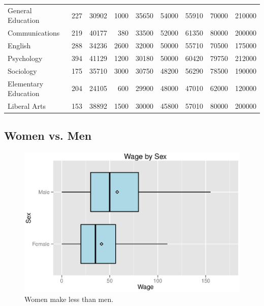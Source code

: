 \documentclass{exam}
\begin{document}
\begin{table}[ht]
\begin{tabular}{lrrrrrrrr}
      General Education    & 227   & 30902   & 1000 & 35650   & 54000  & 55910  & 70000   & 210000 \\
      Communications       & 219   & 40177   & 380  & 33500   & 52000  & 61350  & 80000   & 200000 \\
      English              & 288   & 34236   & 2600 & 32000   & 50000  & 55710  & 70500   & 175000 \\
      Psychology           & 394   & 41129   & 1200 & 30180   & 50000  & 60420  & 79750   & 212000 \\
      Sociology            & 175   & 35710   & 3000 & 30750   & 48200  & 56290  & 78500   & 190000 \\
      Elementary Education & 204   & 24105   & 600  & 29900   & 48000  & 47010  & 62000   & 120000 \\
      Liberal Arts         & 153   & 38892   & 1500 & 30000   & 45800  & 57010  & 80000   & 200000 \\
      \bottomrule
    \end{tabular}
  \end{table}


  \subsection{Women vs. Men}

  \begin{figure}[H]
    \centering
    \includegraphics[scale = 0.8]{figures/wa_wage_by_sex.eps}
    \caption{Women make less than men.}
  \end{figure}
  
\end{document}
